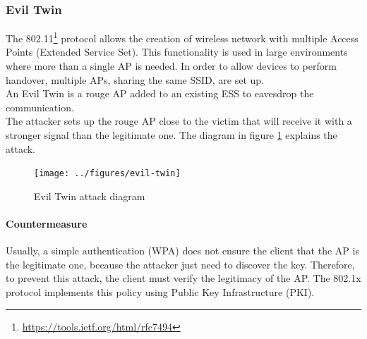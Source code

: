 \documentclass[final]{article}
\begin{document}
\subsubsection{Evil Twin}
The 802.11\footnote{\url{https://tools.ietf.org/html/rfc7494}} protocol allows
the creation of wireless network with multiple Access Points (Extended Service Set).
This functionality is used in large environments where more than a single AP is needed.
In order to allow devices to perform handover, multiple APs, sharing the same \ac{SSID}, are set up. \\
An Evil Twin is a rouge AP added to an existing ESS to eavesdrop the communication.\\
The attacker sets up the rouge AP close to the victim that will receive it with a stronger signal than the legitimate one.
The diagram in figure \ref{evil_twin} explains the attack.
\begin{figure}[h]
  \center
  \texttt{[image: ../figures/evil-twin]}
  \caption{Evil Twin attack diagram}
  \label{evil_twin}
\end{figure}
\paragraph{Countermeasure}
Usually, a simple authentication (WPA) does not ensure the client that the AP is the legitimate one, because the attacker just need to discover the key.
Therefore, to prevent this attack, the client must verify the legitimacy of the AP. The 802.1x protocol implements this policy using Public Key Infrastructure (PKI).
\newpage
\end{document}
